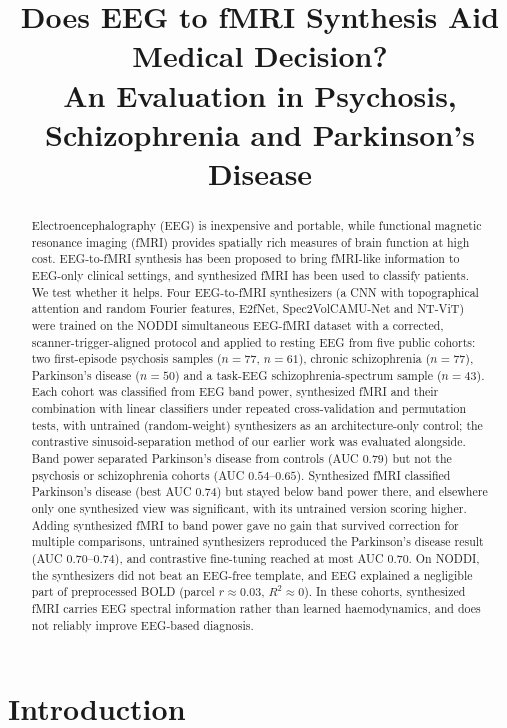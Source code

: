 \documentclass{article}
\date{}
\title{Does EEG to fMRI Synthesis Aid Medical Decision?\\ An Evaluation in Psychosis, Schizophrenia and Parkinson's Disease}
\author{}
\begin{document}
\maketitle

\begin{abstract}
Electroencephalography (EEG) is inexpensive and portable, while functional magnetic resonance imaging (fMRI) provides spatially rich measures of brain function at high cost. EEG-to-fMRI synthesis has been proposed to bring fMRI-like information to EEG-only clinical settings, and synthesized fMRI has been used to classify patients. We test whether it helps. Four EEG-to-fMRI synthesizers (a CNN with topographical attention and random Fourier features, E2fNet, Spec2VolCAMU-Net and NT-ViT) were trained on the NODDI simultaneous EEG-fMRI dataset with a corrected, scanner-trigger-aligned protocol and applied to resting EEG from five public cohorts: two first-episode psychosis samples ($n=77$, $n=61$), chronic schizophrenia ($n=77$), Parkinson's disease ($n=50$) and a task-EEG schizophrenia-spectrum sample ($n=43$). Each cohort was classified from EEG band power, synthesized fMRI and their combination with linear classifiers under repeated cross-validation and permutation tests, with untrained (random-weight) synthesizers as an architecture-only control; the contrastive sinusoid-separation method of our earlier work was evaluated alongside. Band power separated Parkinson's disease from controls (AUC $0.79$) but not the psychosis or schizophrenia cohorts (AUC $0.54$--$0.65$). Synthesized fMRI classified Parkinson's disease (best AUC $0.74$) but stayed below band power there, and elsewhere only one synthesized view was significant, with its untrained version scoring higher. Adding synthesized fMRI to band power gave no gain that survived correction for multiple comparisons, untrained synthesizers reproduced the Parkinson's disease result (AUC $0.70$--$0.74$), and contrastive fine-tuning reached at most AUC $0.70$. On NODDI, the synthesizers did not beat an EEG-free template, and EEG explained a negligible part of preprocessed BOLD (parcel $r\approx0.03$, $R^2\approx0$). In these cohorts, synthesized fMRI carries EEG spectral information rather than learned haemodynamics, and does not reliably improve EEG-based diagnosis.
\end{abstract}

\section{Introduction}\label{section:introduction}
\end{document}
